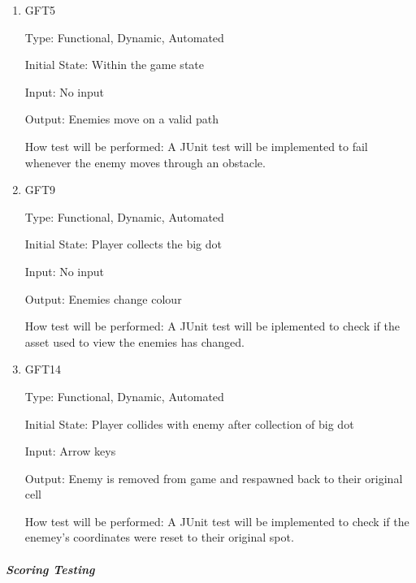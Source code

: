 \documentclass[12pt, titlepage]{article}
\begin{document}
\begin{enumerate}

\item{GFT5\\}

Type: Functional, Dynamic, Automated
					
Initial State: Within the game state
					
Input: No input
					
Output: Enemies move on a valid path

How test will be performed: A JUnit test will be implemented to fail whenever the enemy moves through an obstacle.

\item{GFT9\\}

Type: Functional, Dynamic, Automated
					
Initial State: Player collects the big dot
					
Input: No input
					
Output: Enemies change colour

How test will be performed: A JUnit test will be iplemented to check if the asset used to view the enemies has changed.

\item{GFT14\\}

Type: Functional, Dynamic, Automated
					
Initial State: Player collides with enemy after collection of big dot
					
Input: Arrow keys
					
Output: Enemy is removed from game and respawned back to their original cell

How test will be performed: A JUnit test will be implemented to check if the enemey's coordinates were reset to their original spot.

\end{enumerate}

\subparagraph{Scoring Testing}
\end{document}
